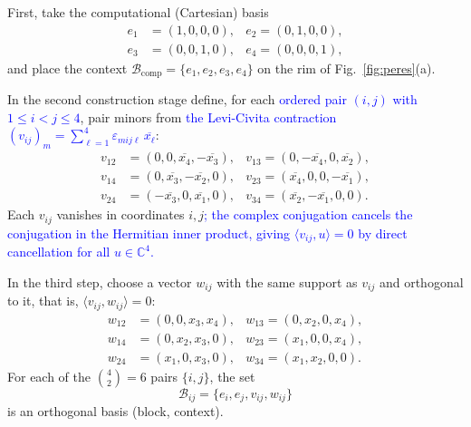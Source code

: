 \documentclass[%
  reprint,
  superscriptaddress,
  showkeys,
  amsmath,amssymb,
  aps,pra,
  longbibliography,
  floatfix,
  x11names
]{revtex4-2}
\DeclareRobustCommand{\chg}[1]{\textcolor{blue}{#1}}
\begin{document}
First, take the computational (Cartesian) basis
\begin{align*}
e_1&=(1,0,0,0), &
e_2 =(0,1,0,0),\\
e_3&=(0,0,1,0), &
e_4 =(0,0,0,1),
\end{align*}
and place the context $\mathcal{B}_{\mathrm{comp}}=\{e_1,e_2,e_3,e_4\}$ on the rim of Fig.~\ref{fig:peres}(a).

In the second construction stage define, for each \chg{ordered pair $(i,j)$ with $1\le i<j\le 4$}, pair minors from \chg{the Levi-Civita contraction $(v_{ij})_m=\sum_{\ell=1}^4\varepsilon_{mij\ell}\,\overline{x_\ell}$}:
\begin{align*}
v_{12} &= (0,0,\overline{x_4},-\overline{x_3}), &
v_{13}  = (0,-\overline{x_4},0,\overline{x_2}), \\
v_{14} &= (0,\overline{x_3},-\overline{x_2},0), &
v_{23}  = (\overline{x_4},0,0,-\overline{x_1}), \\
v_{24} &= (-\overline{x_3},0,\overline{x_1},0), &
v_{34}  = (\overline{x_2},-\overline{x_1},0,0).
\end{align*}
Each $v_{ij}$ vanishes in coordinates $i,j$\chg{; the complex conjugation cancels the conjugation in the Hermitian inner product, giving $\langle v_{ij},u\rangle=0$ by direct cancellation for all $u\in\mathbb{C}^4$.}

In the third step, choose a vector $w_{ij}$ with the same support as $v_{ij}$ and orthogonal to it, that is, $\langle v_{ij},w_{ij}\rangle=0$:
\begin{align*}
w_{12}&=(0,0,x_3,x_4), &
w_{13} =(0,x_2,0,x_4), \\
w_{14}&=(0,x_2,x_3,0), &
w_{23} =(x_1,0,0,x_4), \\
w_{24}&=(x_1,0,x_3,0), &
w_{34} =(x_1,x_2,0,0).
\end{align*}
For each of the $\binom{4}{2}=6$ pairs $\{i,j\}$, the set
\[
\mathcal{B}_{ij}=\{e_i, e_j, v_{ij}, w_{ij}\}
\]
is an orthogonal basis (block, context).
\end{document}
